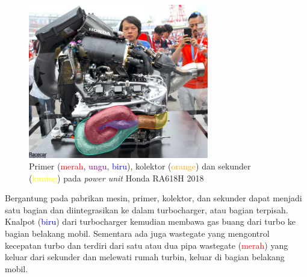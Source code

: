 \begin{figure}[htbp]
    \centering
    \includegraphics[width=0.7\textwidth]{images/F1-Exhaust-primaries_Honda_RA618H.jpg}
    \caption{Primer (\textcolor{red}{merah}, \textcolor{purple}{ungu}, \textcolor{blue}{biru}), kolektor (\textcolor{orange}{orange}) dan sekunder (\textcolor{yellow}{kuning}) pada \textit{power unit} Honda RA618H 2018}
    \label{fig:The primaries (red, purple, blue), collector (orange) and secondaries (yellow) on the 2018 Honda RA618H power unit}
\end{figure}

Bergantung pada pabrikan mesin, primer, kolektor, dan sekunder dapat menjadi satu bagian dan diintegrasikan ke dalam turbocharger, atau bagian terpisah. Knalpot (\textcolor{blue}{biru}) dari turbocharger kemudian membawa gas buang dari turbo ke bagian belakang mobil. Sementara ada juga wastegate yang mengontrol kecepatan turbo dan terdiri dari satu atau dua pipa wastegate (\textcolor{red}{merah}) yang keluar dari sekunder dan melewati rumah turbin, keluar di bagian belakang mobil.

